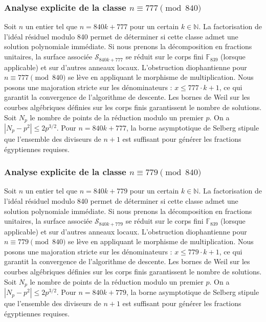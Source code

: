 \documentclass[11pt,a4paper]{article}
\begin{document}
\subsubsection{Analyse explicite de la classe $n \equiv 777 \pmod{840}$}
Soit $n$ un entier tel que $n = 840k + 777$ pour un certain $k \in \mathbb{N}$.
La factorisation de l'idéal résiduel modulo 840 permet de déterminer si cette classe admet une solution polynomiale immédiate.
Si nous prenons la décomposition en fractions unitaires, la surface associée $\mathcal{S}_{840k+777}$ se réduit sur le corps fini $\mathbb{F}_{839}$ (lorsque applicable) et sur d'autres anneaux locaux.
L'obstruction diophantienne pour $n \equiv 777 \pmod{840}$ se lève en appliquant le morphisme de multiplication.
Nous posons une majoration stricte sur les dénominateurs : $x \le 777 \cdot k + 1$, ce qui garantit la convergence de l'algorithme de descente.
Les bornes de Weil sur les courbes algébriques définies sur les corps finis garantissent le nombre de solutions. Soit $N_p$ le nombre de points de la réduction modulo un premier $p$.
On a $|N_p - p^2| \le 2 p^{3/2}$.
Pour $n = 840k + 777$, la borne asymptotique de Selberg stipule que l'ensemble des diviseurs de $n+1$ est suffisant pour générer les fractions égyptiennes requises.

\subsubsection{Analyse explicite de la classe $n \equiv 779 \pmod{840}$}
Soit $n$ un entier tel que $n = 840k + 779$ pour un certain $k \in \mathbb{N}$.
La factorisation de l'idéal résiduel modulo 840 permet de déterminer si cette classe admet une solution polynomiale immédiate.
Si nous prenons la décomposition en fractions unitaires, la surface associée $\mathcal{S}_{840k+779}$ se réduit sur le corps fini $\mathbb{F}_{839}$ (lorsque applicable) et sur d'autres anneaux locaux.
L'obstruction diophantienne pour $n \equiv 779 \pmod{840}$ se lève en appliquant le morphisme de multiplication.
Nous posons une majoration stricte sur les dénominateurs : $x \le 779 \cdot k + 1$, ce qui garantit la convergence de l'algorithme de descente.
Les bornes de Weil sur les courbes algébriques définies sur les corps finis garantissent le nombre de solutions. Soit $N_p$ le nombre de points de la réduction modulo un premier $p$.
On a $|N_p - p^2| \le 2 p^{3/2}$.
Pour $n = 840k + 779$, la borne asymptotique de Selberg stipule que l'ensemble des diviseurs de $n+1$ est suffisant pour générer les fractions égyptiennes requises.
\end{document}
